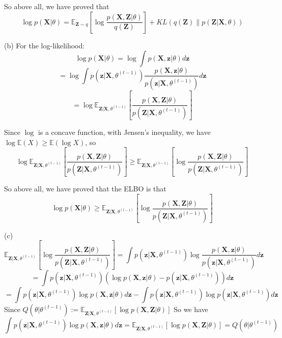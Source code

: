 \documentclass[10pt]{article}
\begin{document}
\begin{enumerate}[1.]
So above all, we have proved that
$$\log p(\boldsymbol{X}|\theta)=\mathbb{E}_{\boldsymbol{Z}\sim q}\left [\log\dfrac{p(\boldsymbol{X},\boldsymbol{Z}|\theta)}{q(\boldsymbol{Z})}\right ]+KL(q(\boldsymbol{Z})\|p(\boldsymbol{Z}|\boldsymbol{X},\theta))$$

(b) For the log-likelihood:
$$\log p(\boldsymbol{X}|\theta)=\log\int p(\boldsymbol{X},\boldsymbol{z}|\theta)d\boldsymbol{z}$$
$$=\log\int p(\boldsymbol{z}|\boldsymbol{X},\theta^{(t-1)})\dfrac{p(\boldsymbol{X},\boldsymbol{z}|\theta)}{p(\boldsymbol{z}|\boldsymbol{X},\theta^{(t-1)})}d\boldsymbol{z}$$
$$=\log \mathbb{E}_{\boldsymbol{Z}|\boldsymbol{X},\theta^{(t-1)}}\left[\dfrac{p(\boldsymbol{X},\boldsymbol{Z}|\theta)}{p(\boldsymbol{Z}|\boldsymbol{X},\theta^{(t-1)})}\right]$$

Since $\log$ is a concave function, with Jensen's inequality, we have $\log \mathbb{E}(X)\geq \mathbb{E}(\log X)$, so
$$\log \mathbb{E}_{\boldsymbol{Z}|\boldsymbol{X},\theta^{(t-1)}}\left[\dfrac{p(\boldsymbol{X},\boldsymbol{Z}|\theta)}{p(\boldsymbol{Z}|\boldsymbol{X},\theta^{(t-1)})}\right]
\geq \mathbb{E}_{\boldsymbol{Z}|\boldsymbol{X},\theta^{(t-1)}}\left[\log \dfrac{p(\boldsymbol{X},\boldsymbol{Z}|\theta)}{p(\boldsymbol{Z}|\boldsymbol{X},\theta^{(t-1)})}\right]$$

So above all, we have proved that the ELBO is that
$$\log p(\boldsymbol{X}|\theta)\geq\mathbb{E}_{\boldsymbol{Z}|\boldsymbol{X},\theta^{(t-1)}}\left[\log \dfrac{p(\boldsymbol{X},\boldsymbol{Z}|\theta)}{p(\boldsymbol{Z}|\boldsymbol{X},\theta^{(t-1)})}\right]$$

(c)
$$\mathbb{E}_{\boldsymbol{Z}|\boldsymbol{X},\theta^{(t-1)}}\left[\log \dfrac{p(\boldsymbol{X},\boldsymbol{Z}|\theta)}{p(\boldsymbol{Z}|\boldsymbol{X},\theta^{(t-1)})}\right]
=\int p(\boldsymbol{z}|\boldsymbol{X},\theta^{(t-1)})\log \dfrac{p(\boldsymbol{X},\boldsymbol{z}|\theta)}{p(\boldsymbol{z}|\boldsymbol{X},\theta^{(t-1)})}d\boldsymbol{z}$$
$$=\int p(\boldsymbol{z}|\boldsymbol{X},\theta^{(t-1)})(\log p(\boldsymbol{X},\boldsymbol{z}|\theta) -  p(\boldsymbol{z}|\boldsymbol{X},\theta^{(t-1)}))d\boldsymbol{z}$$
$$=\int p(\boldsymbol{z}|\boldsymbol{X},\theta^{(t-1)})\log p(\boldsymbol{X},\boldsymbol{z}|\theta)d\boldsymbol{z}-\int p(\boldsymbol{z}|\boldsymbol{X},\theta^{(t-1)})\log p(\boldsymbol{z}|\boldsymbol{X},\theta^{(t-1)})d\boldsymbol{z}$$
Since $Q(\theta|\theta^{(t-1)}):=\mathbb{E}_{\boldsymbol{Z}|\boldsymbol{X},\theta^{(t-1)}}\left[\log p(\boldsymbol{X},\boldsymbol{Z}|\theta)\right]$
So we have
$$\int p(\boldsymbol{z}|\boldsymbol{X},\theta^{(t-1)})\log p(\boldsymbol{X},\boldsymbol{z}|\theta)d\boldsymbol{z}=\mathbb{E}_{\boldsymbol{Z}|\boldsymbol{X},\theta^{(t-1)}}\left[\log p(\boldsymbol{X},\boldsymbol{Z}|\theta)\right]=Q(\theta|\theta^{(t-1)})$$


\end{enumerate}
\end{document}
